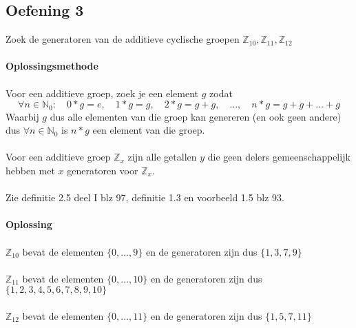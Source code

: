 \documentclass[11pt,a4paper,titlepage]{article}
\begin{document}
\subsection{Oefening 3}
Zoek de generatoren van de additieve cyclische groepen $\mathbb{Z}_{10}, \mathbb{Z}_{11}, \mathbb{Z}_{12}$
\\ \\ \textbf{Oplossingsmethode} \\ \\
Voor een additieve groep, zoek je een element $g$ zodat 
	$$\forall n \in \mathbb{N}_0 : \quad 0*g = e, \quad 1*g = g, \quad 2*g = g+g, \quad \dots , \quad  n*g = g+g+\dots + g$$
Waarbij $g$ dus alle elementen van die groep kan genereren (en ook geen andere) dus $\forall n \in \mathbb{N}_0$ is $n*g$ een element van die groep. \\ \\
Voor een additieve groep $\mathbb{Z}_{x}$ zijn alle getallen $y$ die geen delers gemeenschappelijk hebben met $x$ generatoren voor $\mathbb{Z}_{x}$. \\ \\
Zie definitie 2.5 deel I blz 97, definitie 1.3 en voorbeeld 1.5 blz 93.
\\ \\ \textbf{Oplossing} \\ \\
$\mathbb{Z}_{10}$ bevat de elementen $\{0,\dots ,9\}$ en de generatoren zijn dus $\{1,3,7,9\}$\\ \\
$\mathbb{Z}_{11}$ bevat de elementen $\{0,\dots ,10\}$ en de generatoren zijn dus $\{1,2,3,4,5,6,7,8,9,10\}$ \\ \\
$\mathbb{Z}_{12}$ bevat de elementen $\{0,\dots ,11\}$ en de generatoren zijn dus $\{1,5,7,11\}$
\end{document}
